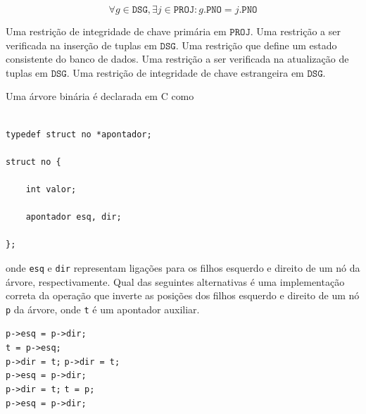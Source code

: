 \documentclass[12pt, addpoints]{exam}
\begin{document}
\begin{questions}
\begin{equation}\forall g \in \texttt{DSG}, \exists j \in \texttt{PROJ} : g.\texttt{PNO} = j.\texttt{PNO}\end{equation}
\begin{choices}
\choice Uma restrição de integridade de chave primária em $\texttt{PROJ}$.
\choice Uma restrição a ser verificada na inserção de tuplas em $\texttt{DSG}$.
\choice Uma restrição que define um estado consistente do banco de dados.
\choice Uma restrição a ser verificada na atualização de tuplas em $\texttt{DSG}$.
\choice Uma restrição de integridade de chave estrangeira em $\texttt{DSG}$.
\end{choices}

\question

Uma árvore binária é declarada em C como



\begin{verbatim}

typedef struct no *apontador;

struct no {

    int valor;

    apontador esq, dir;

};

\end{verbatim}



onde \texttt{esq} e \texttt{dir} representam ligações para os filhos esquerdo e direito de um nó da árvore, respectivamente. Qual das seguintes alternativas é uma implementação correta da operação que inverte as posições dos filhos esquerdo e direito de um nó \texttt{p} da árvore, onde \texttt{t} é um apontador auxiliar.


\begin{choices}
\choice \texttt{p->esq = p->dir;} \\

          \texttt{t = p->esq;} \\

          \texttt{p->dir = t;}
\choice \texttt{p->dir = t;} \\

          \texttt{p->esq = p->dir;} \\

          \texttt{p->dir = t;}
\choice \texttt{t = p;} \\

          \texttt{p->esq = p->dir;} \\


\end{choices}
\end{questions}
\end{document}
